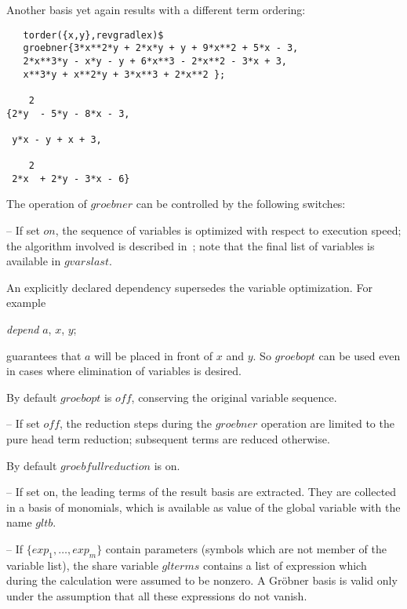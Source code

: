 Another basis yet again results with a different term ordering:
\begin{verbatim}
   torder({x,y},revgradlex)$
   groebner{3*x**2*y + 2*x*y + y + 9*x**2 + 5*x - 3,
   2*x**3*y - x*y - y + 6*x**3 - 2*x**2 - 3*x + 3,
   x**3*y + x**2*y + 3*x**3 + 2*x**2 };

    2
{2*y  - 5*y - 8*x - 3,

 y*x - y + x + 3,

    2
 2*x  + 2*y - 3*x - 6}

\end{verbatim}


The operation of $groebner$ can be controlled by the following switches:
\begin{description}
\item[groebopt] -- If set $on$, the sequence of variables is optimized
with respect to execution speed; the algorithm involved is described
in~\cite{Boege:86}; note that the final list of variables is available in
$gvarslast$.

An explicitly declared dependency supersedes the variable optimization. For example
\begin{center}
{\it depend} $a$, $x$, $y$;
\end{center}
guarantees that $a$ will be placed in front of $x$ and $y$. So
$groebopt$ can be used even in cases where elimination of variables is desired.

By default $groebopt$ is $off$, conserving the original variable sequence.

\item[$groebfullreduction$] -- If set $off$, the reduction steps during
the \linebreak[4] $groebner$ operation are limited to the pure head
term reduction; subsequent terms are reduced otherwise.

By default $groebfullreduction$ is on.

\item[$gltbasis$] -- If set on, the leading terms of the result basis are
extracted. They are collected in a basis of monomials, which is
available as value of the global variable with the name $gltb$.

\item[$glterms$] -- If $\{exp_1, \ldots , exp_m\} $ contain parameters
(symbols which are not member of the variable list), the share variable
{\tt $glterms$} contains a list of expression which during the
calculation were assumed to be nonzero. A Gr\"obner basis
is valid only under the assumption that all these expressions do not vanish.

\end{description}

